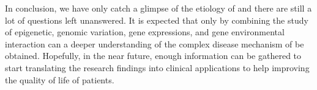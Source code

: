 \documentclass[12pt]{scrbook}
\newcommand*{\glng}{\glsentrylong}
\begin{document}
	In conclusion, we have only catch a glimpse of the etiology of \glng{scz} and there are still a lot of questions left unanswered.
	It is expected that only by combining the study of epigenetic, genomic variation, gene expressions, and gene environmental interaction can a deeper understanding of the complex disease mechanism of \glng{scz} be obtained.
	Hopefully, in the near future, enough information can be gathered to start translating the research findings into clinical applications to help improving the quality of life of \glng{scz} patients.
	
	
	\backmatter
	\printbibliography[heading=bibintoc,title={Bibliography}]

\end{document}
